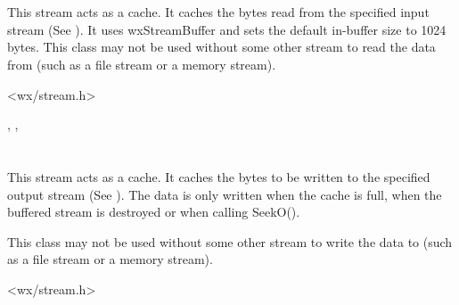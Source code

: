 \section{}\label{wxbufferedinputstream}

This stream acts as a cache. It caches the bytes read from the specified
input stream (See ).
It uses wxStreamBuffer and sets the default in-buffer size to 1024 bytes.
This class may not be used without some other stream to read the data
from (such as a file stream or a memory stream).




<wx/stream.h>


, ,

\section{}\label{wxbufferedoutputstream}

This stream acts as a cache. It caches the bytes to be written to the specified
output stream (See ). The
data is only written when the cache is full, when the buffered stream is
destroyed or when calling SeekO().

This class may not be used without some other stream to write the data
to (such as a file stream or a memory stream).




<wx/stream.h>


